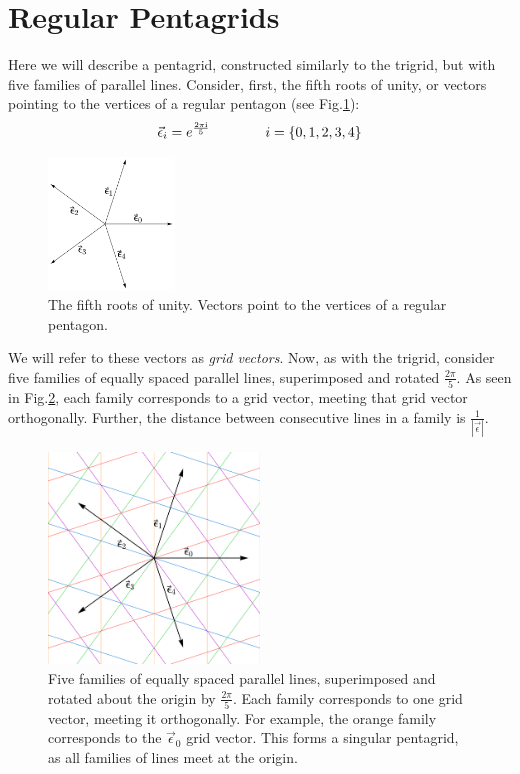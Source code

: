 \documentclass[
  oneside,
  11pt, a4paper,
  footinclude=true,
  headinclude=true,
  cleardoublepage=empty
]{scrbook}
\begin{document}
\section{Regular Pentagrids}
Here we will describe a pentagrid, constructed similarly to the trigrid, but with five families of parallel lines. Consider, first, the fifth roots of unity, or vectors pointing to the vertices of a regular pentagon (see Fig.\ref{fig:rootsunity}):
\begin{equation*}
\vec{\epsilon}_i= e^{\frac{2 \pi \mathrm{i}}{5}} \qquad \qquad i=\{0,1,2,3,4\}\\
\end{equation*}
\begin{figure}[H]
\centering
\includegraphics[width=0.3\textwidth]{RootsUnity}
\caption[Fifth Roots of Unity]{The fifth roots of unity. Vectors point to the vertices of a regular pentagon.}
\label{fig:rootsunity}
\end{figure}

We will refer to these vectors as \textit{grid vectors}. Now, as with the trigrid, consider five families of equally spaced parallel lines, superimposed and rotated $\frac{2\pi}{5}$. As seen in Fig.\ref{fig:singularpentagrid}, each family corresponds to a grid vector, meeting that grid vector orthogonally. Further, the distance between consecutive lines in a family is $\frac{1}{|\vec{\epsilon}|}$.
\begin{figure}[H]
\centering
\includegraphics[width=0.5\textwidth]{SingularPentagrid}
\caption[Singular Pentagrid]{Five families of equally spaced parallel lines, superimposed and rotated about the origin by $\frac{2\pi}{5}$. Each family corresponds to one grid vector, meeting it orthogonally. For example, the orange family corresponds to the $\vec{\epsilon}_0$ grid vector. This forms a singular pentagrid, as all families of lines meet at the origin.}
\label{fig:singularpentagrid}
\end{figure}
\end{document}
